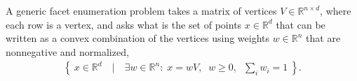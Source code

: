 A generic facet enumeration problem takes a matrix of vertices $V\in\mathbb{R}^{n\times d}$, where each row is a vertex, and asks what is the set of points $x\in\mathbb{R}^d$ that can be written as a convex combination of the vertices using weights $w\in\mathbb{R}^n$ that are nonnegative and normalized,
\begin{align}
	\label{projsimplex}
	\left\{\: x\in\mathbb{R}^d \quad\bigg|\quad \exists w\in\mathbb{R}^n:\; x = w V ,\;\; w\geq 0,\;\; {{\sum_i}{w_i}}=1 \:\right\}.
\end{align}
